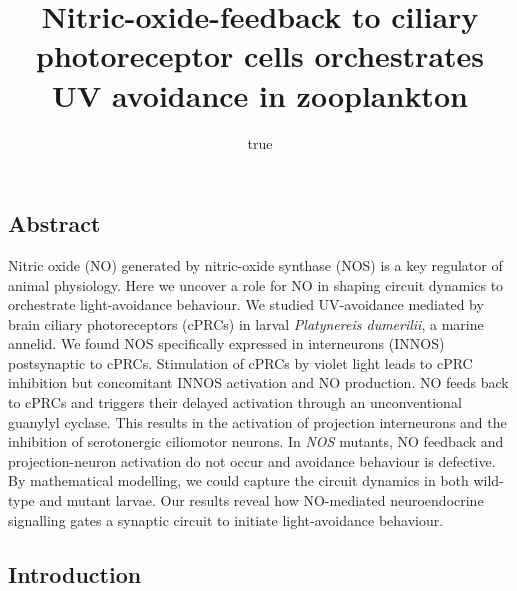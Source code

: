 \documentclass[
  10pt,
  onecolumn]{article}
\title{Nitric-oxide-feedback to ciliary photoreceptor cells orchestrates
UV avoidance in zooplankton}
\author{true}
\date{}
\begin{document}
\maketitle

\hypertarget{abstract}{%
\subsection{Abstract}\label{abstract}}

Nitric oxide (NO) generated by nitric-oxide synthase (NOS) is a key
regulator of animal physiology. Here we uncover a role for NO in shaping
circuit dynamics to orchestrate light-avoidance behaviour. We studied
UV-avoidance mediated by brain ciliary photoreceptors (cPRCs) in larval
\emph{Platynereis dumerilii}, a marine annelid. We found NOS
specifically expressed in interneurons (INNOS) postsynaptic to cPRCs.
Stimulation of cPRCs by violet light leads to cPRC inhibition but
concomitant INNOS activation and NO production. NO feeds back to cPRCs
and triggers their delayed activation through an unconventional guanylyl
cyclase. This results in the activation of projection interneurons and
the inhibition of serotonergic ciliomotor neurons. In \emph{NOS}
mutants, NO feedback and projection-neuron activation do not occur and
avoidance behaviour is defective. By mathematical modelling, we could
capture the circuit dynamics in both wild-type and mutant larvae. Our
results reveal how NO-mediated neuroendocrine signalling gates a
synaptic circuit to initiate light-avoidance behaviour.

\hypertarget{introduction}{%
\subsection{Introduction}\label{introduction}}
\end{document}
